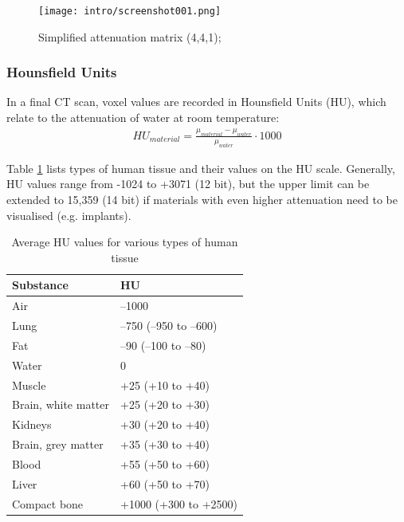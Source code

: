 \begin{figure}[!htb]
	\centering
	\texttt{[image: intro/screenshot001.png]}
	\caption{Simplified attenuation matrix (4,4,1); \cite{Maidment2014}}
	\label{fig:voxel_matrix}
\end{figure}

\subsubsection{Hounsfield Units}

In a final CT scan, voxel values are recorded in Hounsfield Units (HU), which relate to the attenuation of water at room temperature:
\begin{align}
HU_{material} = \frac{\mu_{material} - \mu_{water}}{\mu_{water}} \cdot 1000
\end{align}

Table \ref{tab:HU} lists types of human tissue and their values on the HU scale.
Generally, HU values range from -1024 to +3071 (12 bit), but the upper limit can be extended to 15,359 (14 bit) if materials with even higher attenuation need to be visualised (e.g. implants). \\

\begin{table}[]
	\centering
	\caption{Average HU values for various types of human tissue}
	\label{tab:HU}
	\begin{tabular}{@{}ll@{}}
		\toprule
		Substance           & HU                     \\ \midrule
		Air                 & –1000                  \\
		Lung                & –750 (–950 to –600)    \\
		Fat                 & –90 (–100 to –80)      \\
		Water               & 0                      \\
		Muscle              & +25 (+10 to +40)       \\
		Brain, white matter & +25 (+20 to +30)       \\
		Kidneys             & +30 (+20 to +40)       \\
		Brain, grey matter  & +35 (+30 to +40)       \\
		Blood               & +55 (+50 to +60)       \\
		Liver               & +60 (+50 to +70)       \\
		Compact bone        & +1000 (+300 to +2500)  \\ \bottomrule
	\end{tabular}
\end{table}


